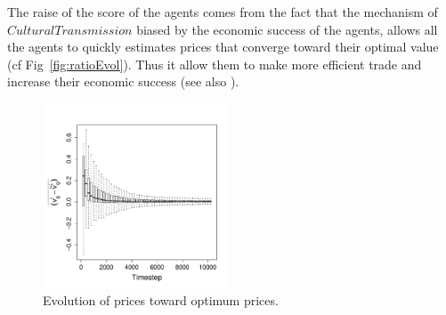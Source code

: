 \documentclass[a0paper,landscape,showframe]{baposter}
\begin{document}
\begin{poster}
{\begin{multicols}{2}
%
%
The raise of the score of the agents comes from the fact that the mechanism of $CulturalTransmission$ biased by the economic success of the agents, allows all the agents to quickly estimates prices that converge toward their optimal value (cf Fig~\ref{fig:ratioEvol}). Thus it allow them to make more efficient trade and increase their economic success (see also \cite{gintis_emergence_2006}).
\vspace{-.8cm}
\begin{figure}[H]
	\begin{multicols}{2}
	\begin{center}
		\includegraphics[width=5.5cm]{img/ClearingPriceDistanceEvolutionForTrade-G3N500.pdf}
	\end{center}
	\caption{
		Evolution of prices toward optimum prices.
}
\end{multicols}
\end{figure}
\end{multicols}}
\end{poster}
\end{document}

